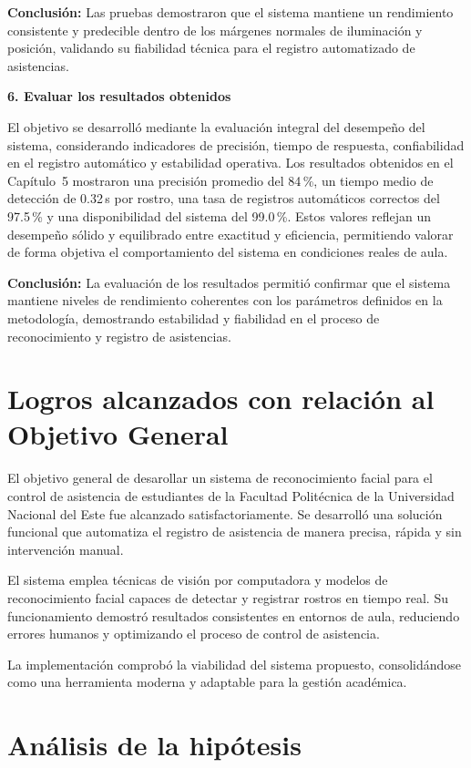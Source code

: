 \textbf{Conclusión:} Las pruebas demostraron que el sistema mantiene un rendimiento consistente y predecible dentro de los márgenes normales de iluminación y posición, validando su fiabilidad técnica para el registro automatizado de asistencias.

\textbf{6. Evaluar los resultados obtenidos}

El objetivo se desarrolló mediante la evaluación integral del desempeño del sistema, considerando indicadores de precisión, tiempo de respuesta, confiabilidad en el registro automático y estabilidad operativa. Los resultados obtenidos en el Capítulo~5 mostraron una precisión promedio del 84\,\%, un tiempo medio de detección de 0.32\,s por rostro, una tasa de registros automáticos correctos del 97.5\,\% y una disponibilidad del sistema del 99.0\,\%. Estos valores reflejan un desempeño sólido y equilibrado entre exactitud y eficiencia, permitiendo valorar de forma objetiva el comportamiento del sistema en condiciones reales de aula.

\textbf{Conclusión:} La evaluación de los resultados permitió confirmar que el sistema mantiene niveles de rendimiento coherentes con los parámetros definidos en la metodología, demostrando estabilidad y fiabilidad en el proceso de reconocimiento y registro de asistencias.

\section{Logros alcanzados con relación al Objetivo General}

El objetivo general de desarollar un sistema de reconocimiento facial para el control de asistencia de estudiantes de la Facultad Politécnica de la Universidad Nacional del Este fue alcanzado satisfactoriamente. Se desarrolló una solución funcional que automatiza el registro de asistencia de manera precisa, rápida y sin intervención manual.

El sistema emplea técnicas de visión por computadora y modelos de reconocimiento facial capaces de detectar y registrar rostros en tiempo real. Su funcionamiento demostró resultados consistentes en entornos de aula, reduciendo errores humanos y optimizando el proceso de control de asistencia.

La implementación comprobó la viabilidad del sistema propuesto, consolidándose como una herramienta moderna y adaptable para la gestión académica.

\section{Análisis de la hipótesis}

